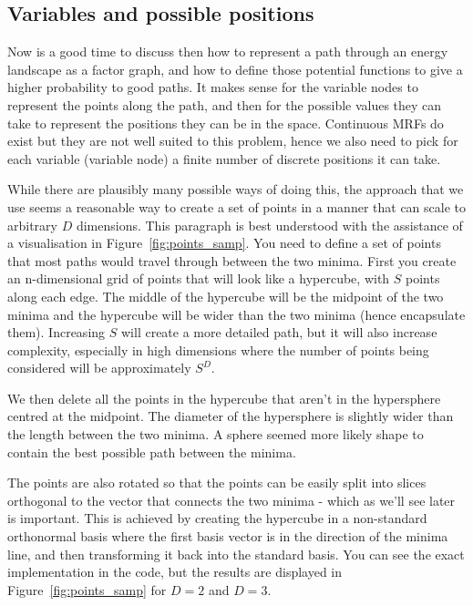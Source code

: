 \subsection{Variables and possible positions}
\label{subsec:poss_poses}
Now is a good time to discuss then how to represent a path through an energy landscape as a factor graph, and how to define those potential functions to give a higher probability to good paths.
It makes sense for the variable nodes to represent the points along the path, and then for the possible values they can take to represent the positions they can be in the space.
Continuous MRFs do exist but they are not well suited to this problem, hence we also need to pick for each variable (variable node) a finite number of discrete positions it can take.

While there are plausibly many possible ways of doing this, the approach that we use seems a reasonable way to create a set of points in a manner that can scale to arbitrary $D$ dimensions.
This paragraph is best understood with the assistance of a visualisation in Figure~\ref{fig:points_samp}.
You need to define a set of points that most paths would travel through between the two minima.
First you create an n-dimensional grid of points that will look like a hypercube, with $S$ points along each edge.
The middle of the hypercube will be the midpoint of the two minima and the hypercube will be wider than the two minima (hence encapsulate them).
Increasing $S$ will create a more detailed path, but it will also increase complexity, especially in high dimensions where the number of points being considered will be approximately $S^D$.

We then delete all the points in the hypercube that aren't in the hypersphere centred at the midpoint.
The diameter of the hypersphere is slightly wider than the length between the two minima.
A sphere seemed more likely shape to contain the best possible path between the minima.

The points are also rotated so that the points can be easily split into slices orthogonal to the vector that connects the two minima - which as we'll see later is important.
This is achieved by creating the hypercube in a non-standard orthonormal basis where the first basis vector is in the direction of the minima line, and then transforming it back into the standard basis.
You can see the exact implementation in the code, but the results are displayed in Figure~\ref{fig:points_samp} for $D=2$ and $D=3$.

